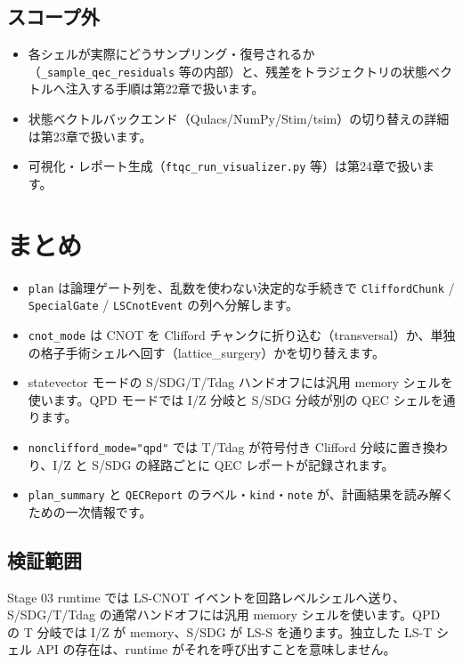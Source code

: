 \subsection{スコープ外}

\begin{itemize}
  \item 各シェルが実際にどうサンプリング・復号されるか（\texttt{\_sample\_qec\_residuals} 等の内部）と、残差をトラジェクトリの状態ベクトルへ注入する手順は第22章で扱います。
  \item 状態ベクトルバックエンド（Qulacs/NumPy/Stim/tsim）の切り替えの詳細は第23章で扱います。
  \item 可視化・レポート生成（\texttt{ftqc\_run\_visualizer.py} 等）は第24章で扱います。
\end{itemize}

\section{まとめ}\label{ch21:summary}

\begin{itemize}
  \item \texttt{plan} は論理ゲート列を、乱数を使わない決定的な手続きで \texttt{CliffordChunk} / \texttt{SpecialGate} / \texttt{LSCnotEvent} の列へ分解します。
  \item \texttt{cnot\_mode} は CNOT を Clifford チャンクに折り込む（transversal）か、単独の格子手術シェルへ回す（lattice\_surgery）かを切り替えます。
  \item statevector モードの S/SDG/T/Tdag ハンドオフには汎用 memory シェルを使います。QPD モードでは I/Z 分岐と S/SDG 分岐が別の QEC シェルを通ります。
  \item \texttt{nonclifford\_mode="qpd"} では T/Tdag が符号付き Clifford 分岐に置き換わり、I/Z と S/SDG の経路ごとに QEC レポートが記録されます。
  \item \texttt{plan\_summary} と \texttt{QECReport} のラベル・\texttt{kind}・\texttt{note} が、計画結果を読み解くための一次情報です。
\end{itemize}

\subsection*{検証範囲}

Stage 03 runtime では LS-CNOT イベントを回路レベルシェルへ送り、S/SDG/T/Tdag の通常ハンドオフには汎用 memory シェルを使います。QPD の T 分岐では I/Z が memory、S/SDG が LS-S を通ります。独立した LS-T シェル API の存在は、runtime がそれを呼び出すことを意味しません。

